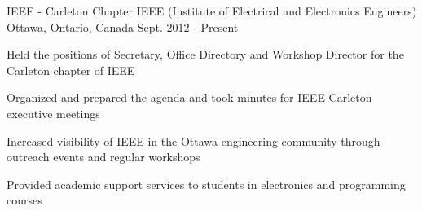 

\begin{cventries}

  \cventry
    {IEEE - Carleton Chapter} %
    {IEEE (Institute of Electrical and Electronics Engineers)} %
    {Ottawa, Ontario, Canada} %
    {Sept. 2012 - Present} %
    {
      \begin{cvitems} %
        \item {Held the positions of Secretary, Office Directory and Workshop Director for the Carleton chapter of IEEE}
        \item {Organized and prepared the agenda and took minutes for IEEE Carleton executive meetings}
        \item {Increased visibility of IEEE in the Ottawa engineering community through outreach events and regular workshops}
        \item {Provided academic support services to students in electronics and programming courses}
      \end{cvitems}
    }

\end{cventries}
